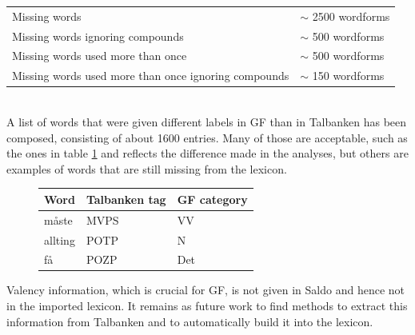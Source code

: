 \documentclass{report}
\begin{document}
\begin{tabular}{|l|l|}
\hline
Missing words & $\sim$ 2500 wordforms\\
Missing words ignoring compounds & $\sim$ 500 wordforms\\
Missing words used more than once & $\sim$ 500 wordforms\\
Missing words used more than once ignoring compounds & $\sim$ 150 wordforms\\
\hline
\end{tabular}\\

A list of words that were given different labels in GF than in Talbanken has been
composed, consisting of about 1600 entries. Many of those are
acceptable, such as the ones in table \ref{tab:saldodiff} and reflects the difference 
made in the analyses, but others are examples of words that are still missing from
the lexicon.
\begin{figure}[h]
\begin{tabular}{|lll|}
\hline
Word & Talbanken tag & GF category \\
\hline
måste & MVPS          & VV \\
allting & POTP & N \\
få & POZP & Det \\
\hline
\end{tabular}
\caption{}
\label{tab:saldodiff}
\end{figure}

Valency information, which is crucial for GF, is not given in Saldo and
hence not in the imported lexicon. It remains as future work to find methods 
to extract this information from Talbanken and to automatically build
it into the lexicon. 
\end{document}
